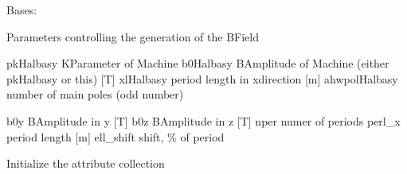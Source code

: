 \documentclass[letterpaper,10pt,english]{sphinxmanual}
\begin{document}
\begin{fulllineitems}
\label{\detokenize{autoapi/unduwave/wave_modules/wave_parameters/index:unduwave.wave_modules.wave_parameters.undu_paras}}
\pysigstartsignatures
{}
\pysigstopsignatures
\sphinxAtStartPar
Bases: {\hyperref[\detokenize{autoapi/unduwave/attribute_classes/attributes/index:unduwave.attribute_classes.attributes._attribute_collection}]{}}

\sphinxAtStartPar
Parameters controlling the generation of the B\sphinxhyphen{}Field
\begin{description}
\sphinxAtStartPar
pkHalbasy \sphinxhyphen{} K\sphinxhyphen{}Parameter of Machine
b0Halbasy \sphinxhyphen{} B\sphinxhyphen{}Amplitude of Machine (either pkHalbasy or this) {[}T{]}
xlHalbasy\sphinxhyphen{} period length in x\sphinxhyphen{}direction {[}m{]}
ahwpolHalbasy \sphinxhyphen{} number of main poles (odd number)

\sphinxAtStartPar
b0y \sphinxhyphen{} B\sphinxhyphen{}Amplitude in y \sphinxhyphen{} {[}T{]}
b0z \sphinxhyphen{} B\sphinxhyphen{}Amplitude in z \sphinxhyphen{} {[}T{]}
nper\sphinxhyphen{} numer of periods
perl\_x \sphinxhyphen{} period length \sphinxhyphen{} {[}m{]}
ell\_shift \sphinxhyphen{} shift, \% of period

\end{description}

\sphinxAtStartPar
Initialize the attribute collection

\begin{fulllineitems}
\label{\detokenize{autoapi/unduwave/wave_modules/wave_parameters/index:unduwave.wave_modules.wave_parameters.undu_paras.pkHalbasy}}
\pysigstartsignatures
{}
\pysigstopsignatures
\end{fulllineitems}



\end{fulllineitems}
\end{document}
